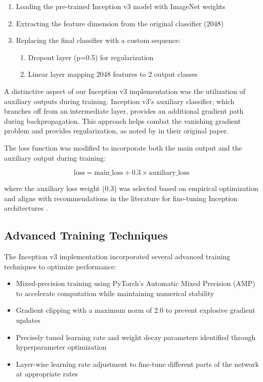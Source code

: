 \begin{enumerate}
    \item Loading the pre-trained Inception v3 model with ImageNet weights
    \item Extracting the feature dimension from the original classifier (2048)
    \item Replacing the final classifier with a custom sequence:
    \begin{enumerate}
        \item Dropout layer (p=0.5) for regularization
        \item Linear layer mapping 2048 features to 2 output classes
    \end{enumerate}
\end{enumerate}

A distinctive aspect of our Inception v3 implementation was the utilization of auxiliary outputs during training. Inception v3's auxiliary classifier, which branches off from an intermediate layer, provides an additional gradient path during backpropagation. This approach helps combat the vanishing gradient problem and provides regularization, as noted by \citep{szegedy2016rethinking} in their original paper.

The loss function was modified to incorporate both the main output and the auxiliary output during training:

\begin{equation}
\text{loss} = \text{main\_loss} + 0.3 \times \text{auxiliary\_loss}
\end{equation}

where the auxiliary loss weight (0.3) was selected based on empirical optimization and aligns with recommendations in the literature for fine-tuning Inception architectures \citep{touvron2021training}.

\subsection{Advanced Training Techniques}

The Inception v3 implementation incorporated several advanced training techniques to optimize performance:

\begin{itemize}
    \item Mixed-precision training using PyTorch's Automatic Mixed Precision (AMP) to accelerate computation while maintaining numerical stability \citep{micikevicius2018mixed}
    \item Gradient clipping with a maximum norm of 2.0 to prevent explosive gradient updates \citep{you2019large}
    \item Precisely tuned learning rate and weight decay parameters identified through hyperparameter optimization
    \item Layer-wise learning rate adjustment to fine-tune different parts of the network at appropriate rates
\end{itemize}

